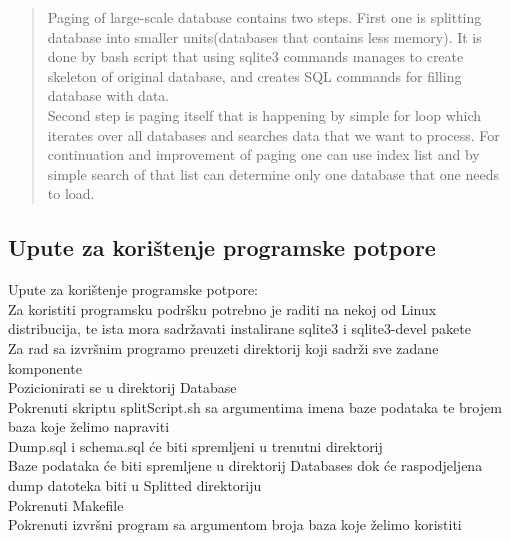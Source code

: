 \documentclass[times, utf8, zavrsni]{fer}
\begin{document}
\begin{abstract}
Paging of large-scale database contains two steps. First one is splitting database into smaller units(databases that contains less memory). It is done by bash script that using sqlite3 commands manages to create skeleton of original database, and creates SQL commands for filling database with data.
\\Second step is paging itself that is happening by simple for loop which iterates over all databases and searches data that we want to process. For continuation and improvement of paging one can use index list and by simple search of that list can determine only one database that one needs to load.

\end{abstract}

\begin{appendices}
	\chapter{Upute za korištenje programske potpore}
	Upute za korištenje programske potpore:
	\\Za koristiti programsku podršku potrebno je raditi na nekoj od Linux distribucija, te ista mora sadržavati instalirane sqlite3 i sqlite3-devel pakete
	\\Za rad sa izvršnim programo preuzeti direktorij koji sadrži sve zadane komponente
	\\Pozicionirati se u direktorij Database
	\\Pokrenuti skriptu splitScript.sh sa argumentima imena baze podataka te brojem baza koje želimo napraviti
	\\Dump.sql i schema.sql će biti spremljeni u trenutni direktorij
	\\Baze podataka će biti spremljene u direktorij Databases dok će raspodjeljena dump datoteka biti u Splitted direktoriju
	\\Pokrenuti Makefile
	\\Pokrenuti izvršni program sa argumentom broja baza koje želimo koristiti
\end{appendices}
\end{document}
